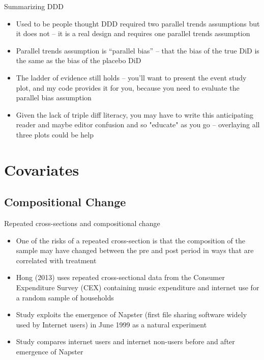 \documentclass{beamer}
\begin{document}
\begin{frame}{Summarizing DDD}

\begin{itemize}
\item Used to be people thought DDD required two parallel trends assumptions but it does not -- it is a real design and requires one parallel trends assumption
\item Parallel trends assumption is ``parallel bias'' -- that the bias of the true DiD is the same as the bias of the placebo DiD
\item The ladder of evidence still holds -- you'll want to present the event study plot, and my code provides it for you, because you need to evaluate the parallel bias assumption
\item Given the lack of triple diff literacy, you may have to write this anticipating reader and maybe editor confusion and so "educate" as you go -- overlaying all three plots could be help

\end{itemize}

\end{frame}




\section{Covariates}

\subsection{Compositional Change}

\begin{frame}{Repeated cross-sections and compositional change}
	
	\begin{itemize}
	\item One of the risks of a repeated cross-section is that the composition of the sample may have changed between the pre and post period in ways that are correlated with treatment
	\item Hong (2013) uses repeated cross-sectional data from the Consumer Expenditure Survey (CEX) containing music expenditure and internet use for a random sample of households
	\item Study exploits the emergence of Napster (first file sharing software widely used by Internet users) in June 1999 as a natural experiment
	\item Study compares internet users and internet non-users before and after emergence of Napster
	\end{itemize}

\end{frame}
\end{document}
